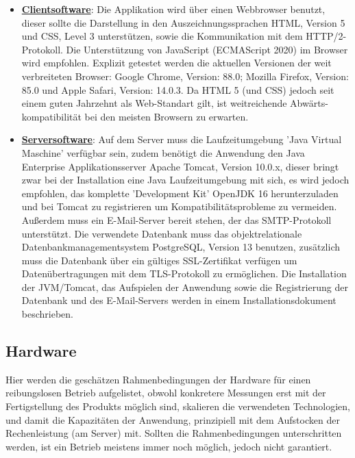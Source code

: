 \documentclass{article}
\begin{document}
\begin{itemize}
\item \underline{\textbf{Clientsoftware}}: \linebreak
Die Applikation wird über einen Webbrowser benutzt, dieser sollte die Darstellung in den Auszeichnungssprachen HTML, Version 5 und CSS, Level 3 unterstützen, sowie die Kommunikation mit dem HTTP/2-Protokoll. Die Unterstützung von JavaScript (ECMAScript 2020) im Browser wird empfohlen. Explizit getestet werden die aktuellen Versionen der weit verbreiteten Browser: Google Chrome, Version: 88.0; Mozilla Firefox, Version: 85.0 und Apple Safari, Version: 14.0.3. Da HTML 5 (und CSS) jedoch seit einem guten Jahrzehnt als Web-Standart gilt, ist weitreichende Abwärts-kompatibilität bei den meisten Browsern zu erwarten.  

\item \underline{\textbf{Serversoftware}}: \linebreak
Auf dem Server muss die Laufzeitumgebung 'Java Virtual Maschine' verfügbar sein, zudem benötigt die Anwendung den Java Enterprise Applikationsserver Apache Tomcat, Version 10.0.x, dieser bringt zwar bei der Installation eine Java Laufzeitumgebung mit sich, es wird jedoch empfohlen, das komplette 'Development Kit' OpenJDK 16 herunterzuladen und bei Tomcat zu registrieren um Kompatibilitätsprobleme zu vermeiden. Außerdem muss ein E-Mail-Server bereit stehen, der das SMTP-Protokoll unterstützt. Die verwendete Datenbank muss das objektrelationale Datenbankmanagementsystem PostgreSQL, Version 13 benutzen, zusätzlich muss die Datenbank über ein gültiges SSL-Zertifikat verfügen um Datenübertragungen mit dem TLS-Protokoll zu ermöglichen. Die Installation der JVM/Tomcat, das Aufspielen der Anwendung sowie die Registrierung der Datenbank und des E-Mail-Servers werden in einem Installationsdokument beschrieben.
\end{itemize}

\subsection{Hardware}

Hier werden die geschätzen Rahmenbedingungen der Hardware für einen reibungslosen Betrieb aufgelistet, obwohl konkretere Messungen erst mit der Fertigstellung des Produkts möglich sind, skalieren die verwendeten Technologien, und damit die Kapazitäten der Anwendung, prinzipiell mit dem Aufstocken der Rechenleistung (am Server) mit. Sollten die Rahmenbedingungen unterschritten werden, ist ein Betrieb meistens immer noch möglich, jedoch nicht garantiert.
\end{document}
